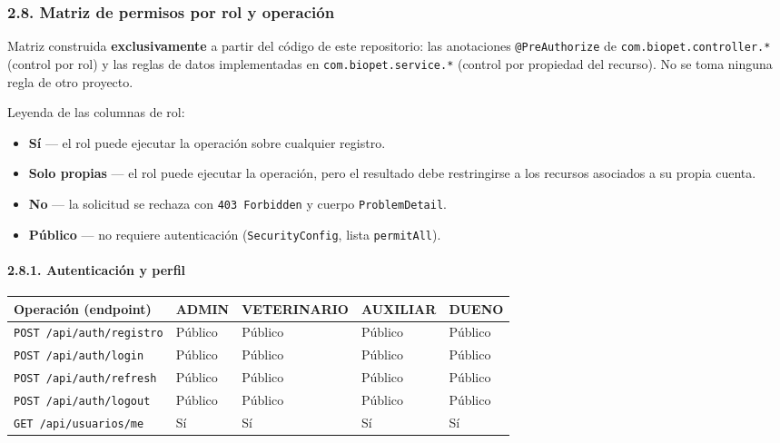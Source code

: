 \documentclass[
  spanish,
]{article}
\newcounter{none} %
\providecommand{\tightlist}{%
  \setlength{\itemsep}{0pt}\setlength{\parskip}{0pt}}
\begin{document}
\subsubsection{2.8. Matriz de permisos por rol y
operación}\label{matriz-de-permisos-por-rol-y-operaciuxf3n}

Matriz construida \textbf{exclusivamente} a partir del código de este
repositorio: las anotaciones \texttt{@Pre\allowbreak{}Authorize} de
\texttt{com.\allowbreak{}biopet.\allowbreak{}controller.*} (control por rol) y las reglas de datos
implementadas en \texttt{com.\allowbreak{}biopet.\allowbreak{}service.*} (control por propiedad
del recurso). No se toma ninguna regla de otro proyecto.

Leyenda de las columnas de rol:

\begin{itemize}
\tightlist
\item
  \textbf{Sí} --- el rol puede ejecutar la operación sobre cualquier
  registro.
\item
  \textbf{Solo propias} --- el rol puede ejecutar la operación, pero el
  resultado debe restringirse a los recursos asociados a su propia
  cuenta.
\item
  \textbf{No} --- la solicitud se rechaza con \texttt{403\ Forbidden} y
  cuerpo \texttt{Problem\allowbreak{}Detail}.
\item
  \textbf{Público} --- no requiere autenticación
  (\texttt{Security\allowbreak{}Config}, lista \texttt{permit\allowbreak{}All}).
\end{itemize}

\paragraph{2.8.1. Autenticación y
perfil}\label{autenticaciuxf3n-y-perfil}

{\def\LTcaptype{none} %
\begin{longtable}[]{@{}lllll@{}}
\toprule\noalign{}
Operación (endpoint) & ADMIN & VETERINARIO & AUXILIAR & DUENO \\
\midrule\noalign{}
\endhead
\bottomrule\noalign{}
\endlastfoot
\texttt{POST\ /\allowbreak{}api/\allowbreak{}auth/\allowbreak{}registro} & Público & Público & Público &
Público \\
\texttt{POST\ /\allowbreak{}api/\allowbreak{}auth/\allowbreak{}login} & Público & Público & Público &
Público \\
\texttt{POST\ /\allowbreak{}api/\allowbreak{}auth/\allowbreak{}refresh} & Público & Público & Público &
Público \\
\texttt{POST\ /\allowbreak{}api/\allowbreak{}auth/\allowbreak{}logout} & Público & Público & Público &
Público \\
\texttt{GET\ /\allowbreak{}api/\allowbreak{}usuarios/\allowbreak{}me} & Sí & Sí & Sí & Sí \\
\end{longtable}
}
\end{document}
